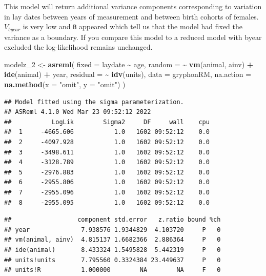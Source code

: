 \documentclass[
  12pt,
]{book}
\newenvironment{Shaded}{\begin{snugshade}}{\end{snugshade}}
\newcommand{\DataTypeTok}[1]{\textcolor[rgb]{0.13,0.29,0.53}{#1}}
\newcommand{\DecValTok}[1]{\textcolor[rgb]{0.00,0.00,0.81}{#1}}
\newcommand{\KeywordTok}[1]{\textcolor[rgb]{0.13,0.29,0.53}{\textbf{#1}}}
\newcommand{\NormalTok}[1]{#1}
\newcommand{\OperatorTok}[1]{\textcolor[rgb]{0.81,0.36,0.00}{\textbf{#1}}}
\newcommand{\StringTok}[1]{\textcolor[rgb]{0.31,0.60,0.02}{#1}}
\begin{document}
This model will return additional variance components corresponding to variation in lay dates between years of measurement and between birth cohorts of females. \(V_{byear}\) is very low and \texttt{B} appeared which tell us that the model had fixed the variance as a boundary. If you compare this model to a reduced model with byear excluded the log-likelihood remains unchanged.

\begin{Shaded}
\begin{Highlighting}[]
\NormalTok{modelz\_}\DecValTok{2}\NormalTok{ \textless{}{-}}\StringTok{ }\KeywordTok{asreml}\NormalTok{(}
  \DataTypeTok{fixed =}\NormalTok{ laydate }\OperatorTok{\textasciitilde{}}\StringTok{ }\NormalTok{age,}
  \DataTypeTok{random =} \OperatorTok{\textasciitilde{}}\StringTok{ }\KeywordTok{vm}\NormalTok{(animal, ainv) }\OperatorTok{+}\StringTok{ }\KeywordTok{ide}\NormalTok{(animal) }\OperatorTok{+}
\StringTok{    }\NormalTok{year,}
  \DataTypeTok{residual =} \OperatorTok{\textasciitilde{}}\StringTok{ }\KeywordTok{idv}\NormalTok{(units),}
  \DataTypeTok{data =}\NormalTok{ gryphonRM,}
  \DataTypeTok{na.action =} \KeywordTok{na.method}\NormalTok{(}\DataTypeTok{x =} \StringTok{"omit"}\NormalTok{, }\DataTypeTok{y =} \StringTok{"omit"}\NormalTok{)}
\NormalTok{)}
\end{Highlighting}
\end{Shaded}

\begin{verbatim}
## Model fitted using the sigma parameterization.
## ASReml 4.1.0 Wed Mar 23 09:52:12 2022
##           LogLik        Sigma2     DF     wall    cpu
##  1     -4665.606           1.0   1602 09:52:12    0.0
##  2     -4097.928           1.0   1602 09:52:12    0.0
##  3     -3498.611           1.0   1602 09:52:12    0.0
##  4     -3128.789           1.0   1602 09:52:12    0.0
##  5     -2976.883           1.0   1602 09:52:12    0.0
##  6     -2955.806           1.0   1602 09:52:12    0.0
##  7     -2955.096           1.0   1602 09:52:12    0.0
##  8     -2955.095           1.0   1602 09:52:12    0.0
\end{verbatim}

\begin{Shaded}
\end{Shaded}

\begin{verbatim}
##                  component std.error   z.ratio bound %ch
## year              7.938576 1.9344829  4.103720     P   0
## vm(animal, ainv)  4.815137 1.6682366  2.886364     P   0
## ide(animal)       8.433324 1.5495828  5.442319     P   0
## units!units       7.795560 0.3324384 23.449637     P   0
## units!R           1.000000        NA        NA     F   0
\end{verbatim}
\end{document}
